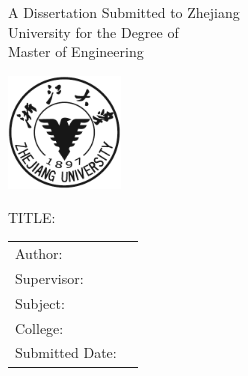 \begin{center}
{
    \linespread{1}
    \erhao
    A Dissertation Submitted to Zhejiang\\
    University for the Degree of\\
    \vspace{0.3em} %
    Master of Engineering\\
}

\vspace{0.95cm}
\includegraphics[width=3.0cm]{img/zjulogo}

{
    \vspace{3.15cm}
    \xiaoer
    TITLE: ~       \underline{\makebox[21em]{\zjutitlee}} \\
    \vspace{0.5cm}
    \hspace{4.0em} \underline{\makebox[21em]{\zjutitleel}}
}

\vspace{1.1em}

{
    \linespread{2}
    \begin{center}
        \sanhao
        \newlength{\majorlength}
        \setlength{\majorlength}{16em}
        \begin{tabular}{l l}
            Author: & \underline{\makebox[\majorlength]{\zjuauthornamee}} \\
            Supervisor: & \underline{\makebox[\majorlength]{\zjuadvisore}} \\
            Subject: & \underline{\makebox[\majorlength]{\zjumajore}} \\
            College: & \underline{\makebox[\majorlength]{\zjucollegee}} \\
            Submitted Date: & \underline{\makebox[\majorlength]{\zjudatee}} \\
        \end{tabular}
      \end{center}
}
\end{center}
